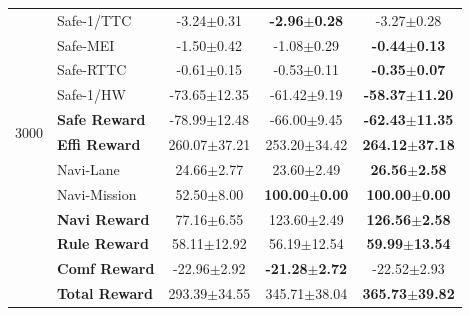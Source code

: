 {\begin{longtable}{l l c c c}
  \multirow{10}{*}{3000}
  & Safe-1/TTC       & -3.24$\pm$0.31 & \textbf{-2.96$\pm$0.28} & -3.27$\pm$0.28 \\
  & Safe-MEI         & -1.50$\pm$0.42 & -1.08$\pm$0.29 & \textbf{-0.44$\pm$0.13} \\
  & Safe-RTTC        & -0.61$\pm$0.15 & -0.53$\pm$0.11 & \textbf{-0.35$\pm$0.07} \\
  & Safe-1/HW        & -73.65$\pm$12.35 & -61.42$\pm$9.19 & \textbf{-58.37$\pm$11.20} \\
  & \textbf{Safe Reward} & -78.99$\pm$12.48 & -66.00$\pm$9.45 & \textbf{-62.43$\pm$11.35} \\
  & \textbf{Effi Reward} & 260.07$\pm$37.21 & 253.20$\pm$34.42 & \textbf{264.12$\pm$37.18} \\
  & Navi-Lane        & 24.66$\pm$2.77 & 23.60$\pm$2.49 & \textbf{26.56$\pm$2.58} \\
  & Navi-Mission     & 52.50$\pm$8.00 & \textbf{100.00$\pm$0.00} & \textbf{100.00$\pm$0.00} \\
  & \textbf{Navi Reward} & 77.16$\pm$6.55 & 123.60$\pm$2.49 & \textbf{126.56$\pm$2.58} \\
  & \textbf{Rule Reward} & 58.11$\pm$12.92 & 56.19$\pm$12.54 & \textbf{59.99$\pm$13.54} \\
  & \textbf{Comf Reward} & -22.96$\pm$2.92 & \textbf{-21.28$\pm$2.72} & -22.52$\pm$2.93 \\
  & \textbf{Total Reward} & 293.39$\pm$34.55 & 345.71$\pm$38.04 & \textbf{365.73$\pm$39.82} \\
  \midrule


\end{longtable}}

